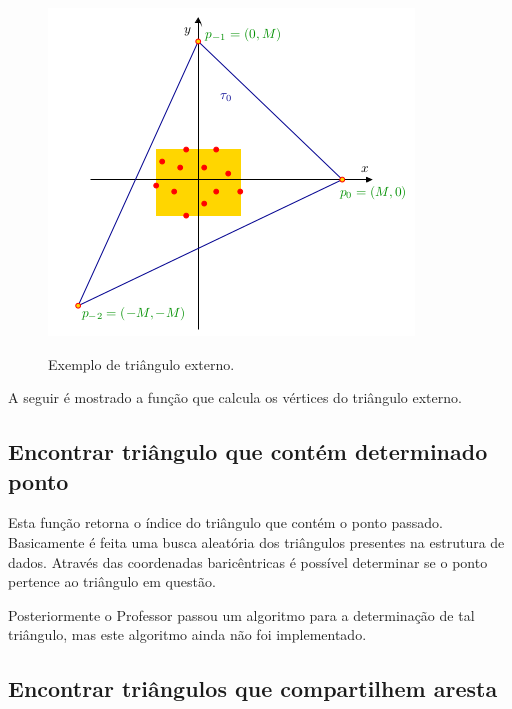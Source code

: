 \documentclass[a4paper]{article}
\begin{document}
\begin{figure}[H]
	\centering
	\includegraphics[width=.8\textwidth]{./imgs/outer_triangle.png}
	\label{fig:outer_triangle} 
	\caption[caption]{Exemplo de triângulo externo.}
\end{figure}



A seguir é mostrado a função que calcula os vértices do triângulo externo.




\subsection{Encontrar triângulo que contém determinado ponto}

Esta função retorna o índice do triângulo que contém o ponto passado. Basicamente é feita uma busca aleatória dos triângulos presentes na estrutura de dados. Através das coordenadas baricêntricas é possível determinar se o ponto pertence ao triângulo em questão.

Posteriormente o Professor passou um algoritmo para a determinação de tal triângulo, mas este algoritmo ainda não foi implementado.






\subsection{Encontrar triângulos que compartilhem aresta}
\end{document}

